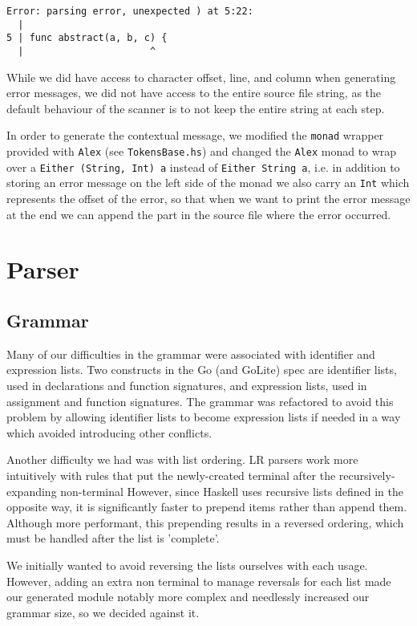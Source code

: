 \documentclass[11pt]{article}
\begin{document}
\begin{verbatim}
Error: parsing error, unexpected ) at 5:22:                                                                
  |
5 | func abstract(a, b, c) {
  |                      ^
\end{verbatim}

While we did have access to character offset, line, and column when
generating error messages, we did not have access to the entire
source file string, as the default behaviour of the scanner is to not
keep the entire string at each step.

In order to generate the contextual message, we modified the \texttt{monad}
wrapper provided with \texttt{Alex} (see \texttt{TokensBase.hs}) and changed the
\texttt{Alex} monad to wrap over a \texttt{Either (String, Int) a} instead of
\texttt{Either String a}, i.e. in addition to storing an error message on
the left side of the monad we also carry an \texttt{Int} which represents
the offset of the error, so that when we want to print the error
message at the end we can append the part in the source file where
the error occurred.
\section{Parser}
\label{sec:org5860e5a}
\subsection{Grammar}
\label{sec:org448cef8}
Many of our difficulties in the grammar were associated with identifier and
expression lists. Two constructs in the Go (and GoLite) spec are identifier
lists, used in declarations and function signatures, and expression lists,
used in assignment and function signatures. The grammar was refactored to
avoid this problem by allowing identifier lists to become expression lists
if needed in a way which avoided introducing other conflicts.

Another difficulty we had was with list ordering. LR parsers
work more intuitively with rules that put the newly-created terminal
after the recursively-expanding non-terminal However, since Haskell
uses recursive lists defined in the opposite way, it is significantly
faster to prepend items rather than append them. Although more
performant, this prepending results in a reversed ordering, which
must be handled after the list is 'complete'.

We initially wanted to avoid reversing the lists ourselves with each usage.
However, adding an extra non terminal to manage reversals for each list made
our generated module notably more complex and needlessly increased our
grammar size, so we decided against it.
\end{document}
